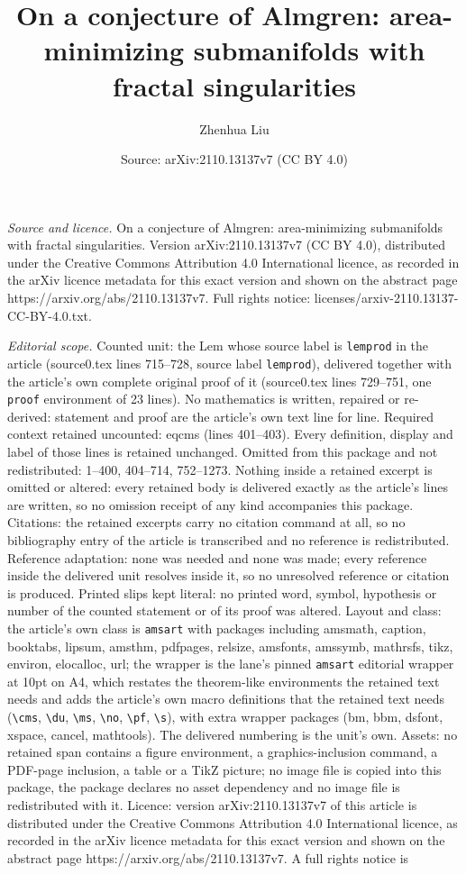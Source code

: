 \documentclass[10pt,a4paper]{amsart}
\title[On a conjecture of Almgren: area-minimizing submanifolds wit]{On a conjecture of Almgren: area-minimizing submanifolds with fractal singularities}
\author{Zhenhua Liu}
\date{Source: arXiv:2110.13137v7 (CC BY 4.0)}
\begin{document}
\maketitle

\noindent\emph{Source and licence.} On a conjecture of Almgren: area-minimizing submanifolds with fractal singularities. Version arXiv:2110.13137v7 (CC BY 4.0), distributed under the Creative Commons Attribution 4.0 International licence, as recorded in the arXiv licence metadata for this exact version and shown on the abstract page https://arxiv.org/abs/2110.13137v7. Full rights notice: licenses/arxiv-2110.13137-CC-BY-4.0.txt.\par\smallskip

\noindent\textit{Editorial scope.} Counted unit: the Lem whose source label is \texttt{lemprod} in the article (source0.tex lines 715--728, source label \texttt{lemprod}), delivered together with the article's own complete original proof of it (source0.tex lines 729--751, one \texttt{proof} environment of 23 lines). No mathematics is written, repaired or re-derived: statement and proof are the article's own text line for line. Required context retained uncounted: eqcms (lines 401--403). Every definition, display and label of those lines is retained unchanged. Omitted from this package and not redistributed: 1--400, 404--714, 752--1273. Nothing inside a retained excerpt is omitted or altered: every retained body is delivered exactly as the article's lines are written, so no omission receipt of any kind accompanies this package. Citations: the retained excerpts carry no citation command at all, so no bibliography entry of the article is transcribed and no reference is redistributed. Reference adaptation: none was needed and none was made; every reference inside the delivered unit resolves inside it, so no unresolved reference or citation is produced. Printed slips kept literal: no printed word, symbol, hypothesis or number of the counted statement or of its proof was altered. Layout and class: the article's own class is \texttt{amsart} with packages including amsmath, caption, booktabs, lipsum, amsthm, pdfpages, relsize, amsfonts, amssymb, mathrsfs, tikz, environ, elocalloc, url; the wrapper is the lane's pinned \texttt{amsart} editorial wrapper at 10pt on A4, which restates the theorem-like environments the retained text needs and adds the article's own macro definitions that the retained text needs (\texttt{\textbackslash cms}, \texttt{\textbackslash du}, \texttt{\textbackslash ms}, \texttt{\textbackslash no}, \texttt{\textbackslash pf}, \texttt{\textbackslash s}), with extra wrapper packages (bm, bbm, dsfont, xspace, cancel, mathtools). The delivered numbering is the unit's own. Assets: no retained span contains a figure environment, a graphics-inclusion command, a PDF-page inclusion, a table or a TikZ picture; no image file is copied into this package, the package declares no asset dependency and no image file is redistributed with it. Licence: version arXiv:2110.13137v7 of this article is distributed under the Creative Commons Attribution 4.0 International licence, as recorded in the arXiv licence metadata for this exact version and shown on the abstract page https://arxiv.org/abs/2110.13137v7. A full rights notice is 
\end{document}
